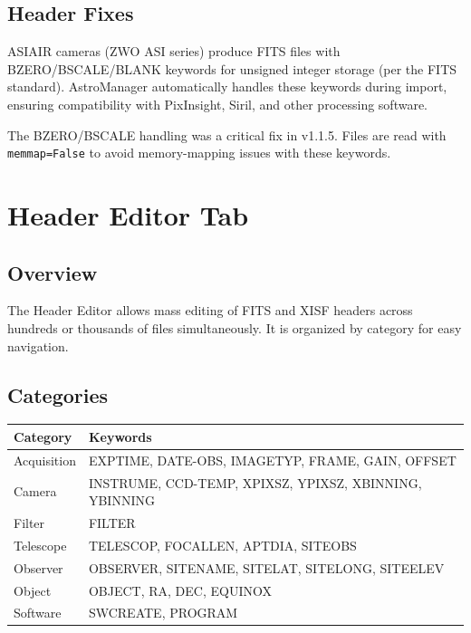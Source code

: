 \documentclass[11pt,a4paper]{article}
\begin{document}
\subsection{Header Fixes}

ASIAIR cameras (ZWO ASI series) produce FITS files with BZERO/BSCALE/BLANK keywords for unsigned integer storage (per the FITS standard). AstroManager automatically handles these keywords during import, ensuring compatibility with PixInsight, Siril, and other processing software.

\begin{notebox}
The BZERO/BSCALE handling was a critical fix in v1.1.5. Files are read with \texttt{memmap=False} to avoid memory-mapping issues with these keywords.
\end{notebox}


\section{Header Editor Tab}
\label{sec:header}

\subsection{Overview}

The Header Editor allows mass editing of FITS and XISF headers across hundreds or thousands of files simultaneously. It is organized by category for easy navigation.

\subsection{Categories}

\begin{center}
\begin{tabular}{lp{9cm}}
\toprule
\textbf{Category} & \textbf{Keywords} \\
\midrule
Acquisition & EXPTIME, DATE-OBS, IMAGETYP, FRAME, GAIN, OFFSET \\
Camera & INSTRUME, CCD-TEMP, XPIXSZ, YPIXSZ, XBINNING, YBINNING \\
Filter & FILTER \\
Telescope & TELESCOP, FOCALLEN, APTDIA, SITEOBS \\
Observer & OBSERVER, SITENAME, SITELAT, SITELONG, SITEELEV \\
Object & OBJECT, RA, DEC, EQUINOX \\
Software & SWCREATE, PROGRAM \\
\bottomrule
\end{tabular}
\end{center}
\end{document}
